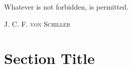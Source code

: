 \epigraph{Whatever is not forbidden, is permitted.}%
{\textsc{J. C. F. von Schiller}}
\null\vfill
\newpage
\blankpagewithnumber
\section{Section Title}
\lipsum[1]

\newpage
\blankpagewithnumber